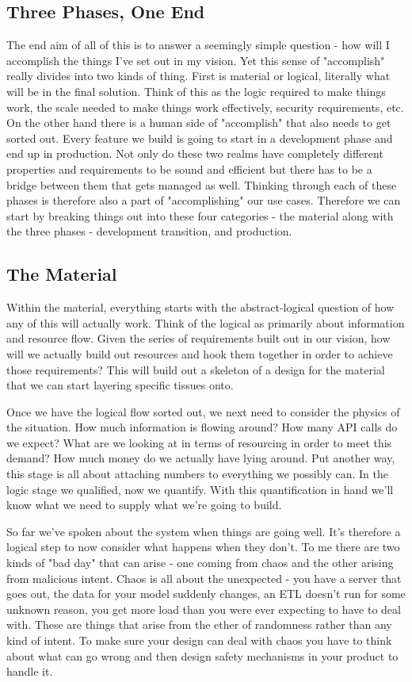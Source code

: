 \documentclass[10pt,a5paper]{book}
\begin{document}
\subsection{Three Phases, One End}
The end aim of all of this is to answer a seemingly simple question - how will I accomplish the things I've set out in my vision. Yet this sense of "accomplish" really divides into two kinds of thing. First is material or logical, literally what will be in the final solution. Think of this as the logic required to make things work, the scale needed to make things work effectively, security requirements, etc. On the other hand there is a human side of "accomplish" that also needs to get sorted out. Every feature we build is going to start in a development phase and end up in production. Not only do these two realms have completely different properties and requirements to be sound and efficient but there has to be a bridge between them that gets managed as well. Thinking through each of these phases is therefore also a part of "accomplishing" our use cases. Therefore we can start by breaking things out into these four categories - the material along with the three phases - development transition, and production. 

\subsection{The Material}
Within the material, everything starts with the abstract-logical question of how any of this will actually work. Think of the logical as primarily about information and resource flow. Given the series of requirements built out in our vision, how will we actually build out resources and hook them together in order to achieve those requirements? This will build out a skeleton of a design for the material that we can start layering specific tissues onto. 

Once we have the logical flow sorted out, we next need to consider the physics of the situation. How much information is flowing around? How many API calls do we expect? What are we looking at in terms of resourcing in order to meet this demand? How much money do we actually have lying around. Put another way, this stage is all about attaching numbers to everything we possibly can. In the logic stage we qualified, now we quantify. With this quantification in hand we'll know what we need to supply what we're going to build.

So far we've spoken about the system when things are going well. It's therefore a logical step to now consider what happens when they don't. To me there are two kinds of "bad day" that can arise - one coming from chaos and the other arising from malicious intent. Chaos is all about the unexpected - you have a server that goes out, the data for your model suddenly changes, an ETL doesn't run for some unknown reason, you get more load than you were ever expecting to have to deal with. These are things that arise from the ether of randomness rather than any kind of intent. To make sure your design can deal with chaos you have to think about what can go wrong and then design safety mechanisms in your product to handle it. 
\end{document}

